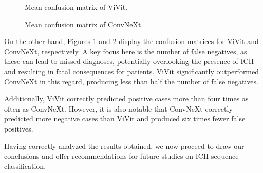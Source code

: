 \begin{figure}[h]
    \centering
    \scalebox{0.7}{}
    \caption{Mean confusion matrix of ViVit.}
    \label{fig:mean_cm_vivit}
\end{figure}

\begin{figure}[h]
    \centering
    \scalebox{0.7}{}
    \caption{Mean confusion matrix of ConvNeXt.}
    \label{fig:mean_cm_ConvNeXt}
\end{figure}

On the other hand, Figures \ref{fig:mean_cm_vivit} and \ref{fig:mean_cm_ConvNeXt} display the confusion matrices for ViVit and ConvNeXt, respectively. A key focus here is the number of false negatives, as these can lead to missed diagnoses, potentially overlooking the presence of ICH and resulting in fatal consequences for patients. ViVit significantly outperformed ConvNeXt in this regard, producing less than half the number of false negatives.

Additionally, ViVit correctly predicted positive cases more than four times as often as ConvNeXt. However, it is also notable that ConvNeXt correctly predicted more negative cases than ViVit and produced six times fewer false positives.

Having correctly analyzed the results obtained, we now proceed to draw our conclusions and offer recommendations for future studies on ICH sequence classification.